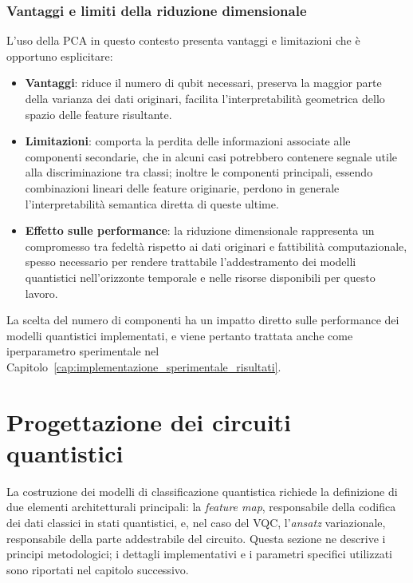 \subsubsection{Vantaggi e limiti della riduzione dimensionale}
L'uso della PCA in questo contesto presenta vantaggi e limitazioni che è opportuno esplicitare:
\begin{itemize}
    \item \textbf{Vantaggi}: riduce il numero di qubit necessari, preserva la maggior parte della varianza dei dati originari, facilita l'interpretabilità geometrica dello spazio delle feature risultante.
    \item \textbf{Limitazioni}: comporta la perdita delle informazioni associate alle componenti secondarie, che in alcuni casi potrebbero contenere segnale utile alla discriminazione tra classi; inoltre le componenti principali, essendo combinazioni lineari delle feature originarie, perdono in generale l'interpretabilità semantica diretta di queste ultime.
    \item \textbf{Effetto sulle performance}: la riduzione dimensionale rappresenta un compromesso tra fedeltà rispetto ai dati originari e fattibilità computazionale, spesso necessario per rendere trattabile l'addestramento dei modelli quantistici nell'orizzonte temporale e nelle risorse disponibili per questo lavoro.
\end{itemize}

La scelta del numero di componenti ha un impatto diretto sulle performance dei modelli quantistici implementati, e viene pertanto trattata anche come iperparametro sperimentale nel Capitolo~\ref{cap:implementazione_sperimentale_risultati}.

\section{Progettazione dei circuiti quantistici}
\label{sec:circuiti_quantistici}

La costruzione dei modelli di classificazione quantistica richiede la definizione di due elementi architetturali principali: la \textit{feature map}, responsabile della codifica dei dati classici in stati quantistici, e, nel caso del VQC, l'\textit{ansatz} variazionale, responsabile della parte addestrabile del circuito. Questa sezione ne descrive i principi metodologici; i dettagli implementativi e i parametri specifici utilizzati sono riportati nel capitolo successivo.

